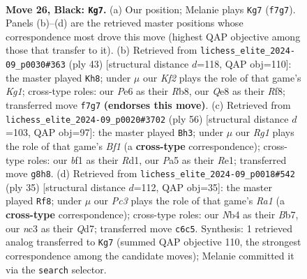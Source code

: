 \documentclass[11pt]{article}
\begin{document}
\begin{figure}[p]
\label{fig:thought-m49}
\end{figure}

\clearpage

\begin{figure}[p]\centering
\begin{subfigure}{0.46\textwidth}\centering
\resizebox{\linewidth}{!}{%
\newchessgame
\chessboard[
  setfen={1nb1q1r1/rp3k2/2p1p3/p2p1p1p/Pn1P1P1N/2N3P1/1PPQ1K1P/3R1B1R b - - 6 26},
  showmover=false,
  pgfstyle=straightmove, color=movearrow, markmove={f7-g7}
]}
\caption{}
\end{subfigure}\hfill
\begin{subfigure}{0.46\textwidth}\centering
\resizebox{\linewidth}{!}{%
\newchessgame
\chessboard[
  setfen={1r3rk1/3b2p1/1q2p2p/2npPp2/pn1N1P2/2N1Q2P/1PPRB1PK/R7 b - - 1 22},
  showmover=false,
  pgfstyle=straightmove, color=movearrow, markmove={g8-h8}
]}
\caption{}
\end{subfigure}
\\[4pt]
\begin{subfigure}{0.46\textwidth}\centering
\resizebox{\linewidth}{!}{%
\newchessgame
\chessboard[
  setfen={3r4/3r2k1/1pq2pp1/p1pnpn1p/4N2P/2PP2P1/1PQ2P2/3RRBK1 w - - 2 29},
  showmover=false,
  pgfstyle=straightmove, color=movearrow, markmove={f1-h3}
]}
\caption{}
\end{subfigure}\hfill
\begin{subfigure}{0.46\textwidth}\centering
\resizebox{\linewidth}{!}{%
\newchessgame
\chessboard[
  setfen={r5k1/1bpq2p1/1p1pp1rp/p4p2/PnPP4/4PN1P/1P3PPB/R2Q1R1K b - - 2 18},
  showmover=false,
  pgfstyle=straightmove, color=movearrow, markmove={a8-f8}
]}
\caption{}
\end{subfigure}
\caption{\textbf{Move 26, Black: \texttt{Kg7}.} (a) Our position; Melanie plays \texttt{Kg7} (\texttt{f7g7}). Panels (b)--(d) are the retrieved master positions whose correspondence most drove this move (highest QAP objective among those that transfer to it). (b) Retrieved from \texttt{lichess\_elite\_2024-09\_p0030\#363} (ply 43) [structural distance $d$=118, QAP obj=110]: the master played \texttt{Kh8}; under $\mu$ our \emph{Kf2} plays the role of that game's \emph{Kg1}; cross-type roles: our \emph{P}e6 as their \emph{R}b8, our \emph{Q}e8 as their \emph{R}f8; transferred move \texttt{f7g7} \textbf{(endorses this move)}. (c) Retrieved from \texttt{lichess\_elite\_2024-09\_p0020\#3702} (ply 56) [structural distance $d$=103, QAP obj=97]: the master played \texttt{Bh3}; under $\mu$ our \emph{Rg1} plays the role of that game's \emph{Bf1} (a \textbf{cross-type} correspondence); cross-type roles: our \emph{b}f1 as their \emph{R}d1, our \emph{P}a5 as their \emph{R}e1; transferred move \texttt{g8h8}. (d) Retrieved from \texttt{lichess\_elite\_2024-09\_p0018\#542} (ply 35) [structural distance $d$=112, QAP obj=35]: the master played \texttt{Rf8}; under $\mu$ our \emph{Pc3} plays the role of that game's \emph{Ra1} (a \textbf{cross-type} correspondence); cross-type roles: our \emph{N}b4 as their \emph{B}b7, our \emph{n}c3 as their \emph{Q}d7; transferred move \texttt{c6c5}. Synthesis: 1 retrieved analog transferred to \texttt{Kg7} (summed QAP objective 110, the strongest correspondence among the candidate moves); Melanie committed it via the \texttt{search} selector.}

\end{figure}
\end{document}
